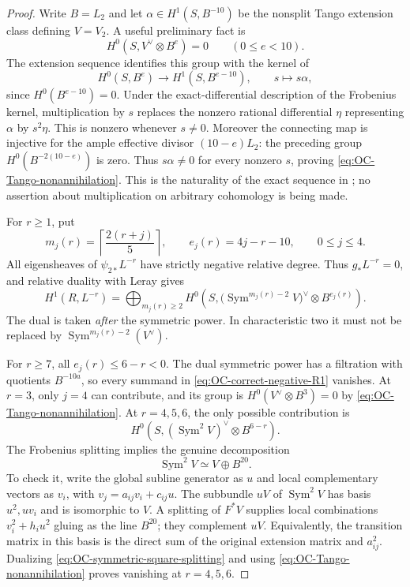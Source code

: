 \begin{proof}
Write $B=L_2$ and let $\alpha\in H^1(S,B^{-10})$ be the nonsplit Tango extension class defining $V=V_2$.  A useful preliminary fact is
\begin{equation}\label{eq:OC-Tango-nonannihilation}
 H^0(S,V^\vee\otimes B^e)=0\qquad(0\leq e<10).
\end{equation}
The extension sequence identifies this group with the kernel of
\[
 H^0(S,B^e)\longrightarrow H^1(S,B^{e-10}),\qquad s\longmapsto s\alpha,
\]
since $H^0(B^{e-10})=0$.  Under the exact-differential description of the Frobenius kernel, multiplication by $s$ replaces the nonzero rational differential $\eta$ representing $\alpha$ by $s^2\eta$.  This is nonzero whenever $s\ne0$.  Moreover the connecting map is injective for the ample effective divisor $(10-e)L_2$: the preceding group $H^0(B^{-2(10-e)})$ is zero.  Thus $s\alpha\ne0$ for every nonzero $s$, proving \eqref{eq:OC-Tango-nonannihilation}.  This is the naturality of the exact sequence in \cite[Theorem~1 and Lemma~1.4, pp.~1, 4--5]{Mukai2011Kodaira}; no assertion about multiplication on arbitrary cohomology is being made.

For $r\geq1$, put
\[
 m_j(r)=\left\lceil\frac{2(r+j)}5\right\rceil,
 \qquad e_j(r)=4j-r-10,\qquad0\leq j\leq4.
\]
All eigensheaves of $\psi_{2*}L^{-r}$ have strictly negative relative degree.  Thus $g_*L^{-r}=0$, and relative duality with Leray gives
\begin{equation}\label{eq:OC-correct-negative-R1}
 H^1(R,L^{-r})=
 \bigoplus_{m_j(r)\geq2}
 H^0\!\left(S,\bigl(\operatorname{Sym}^{m_j(r)-2}V\bigr)^\vee
                                      \otimes B^{e_j(r)}\right).
\end{equation}
The dual is taken \emph{after} the symmetric power.  In characteristic two it must not be replaced by $\operatorname{Sym}^{m_j(r)-2}(V^\vee)$.

For $r\geq7$, all $e_j(r)\leq6-r<0$.  The dual symmetric power has a filtration with quotients $B^{-10a}$, so every summand in \eqref{eq:OC-correct-negative-R1} vanishes.
At $r=3$, only $j=4$ can contribute, and its group is $H^0(V^\vee\otimes B^3)=0$ by \eqref{eq:OC-Tango-nonannihilation}.
At $r=4,5,6$, the only possible contribution is
\[
              H^0\!\left(S,(\operatorname{Sym}^2V)^\vee
                                                   \otimes B^{6-r}\right).
\]
The Frobenius splitting implies the genuine decomposition
\begin{equation}\label{eq:OC-symmetric-square-splitting}
                         \operatorname{Sym}^2V\simeq V\oplus B^{20}.
\end{equation}
To check it, write the global subline generator as $u$ and local complementary vectors as $v_i$, with $v_j=a_{ij}v_i+c_{ij}u$.  The subbundle $uV$ of $\operatorname{Sym}^2V$ has basis $u^2,uv_i$ and is isomorphic to $V$.  A splitting of $F^*V$ supplies local combinations $v_i^2+h_i u^2$ gluing as the line $B^{20}$; they complement $uV$.  Equivalently, the transition matrix in this basis is the direct sum of the original extension matrix and $a_{ij}^2$.  Dualizing \eqref{eq:OC-symmetric-square-splitting} and using \eqref{eq:OC-Tango-nonannihilation} proves vanishing at $r=4,5,6$.


\end{proof}
